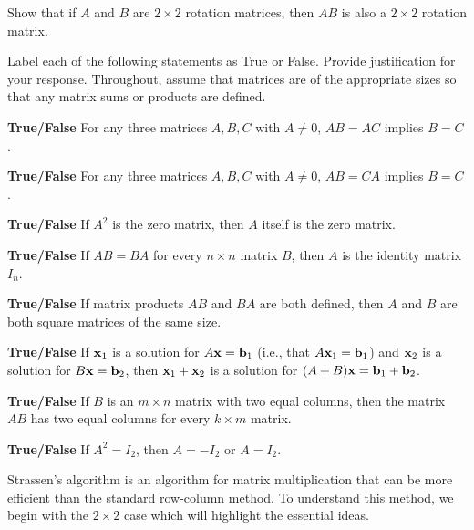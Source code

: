 	\ea

\item Show that if $A$ and $B$ are $2\times 2$ rotation matrices, then $AB$ is also a $2\times 2$ rotation matrix. 
	
\item Label each of the following statements as True or False. Provide justification for your response. Throughout, assume that matrices are of the appropriate sizes so that any matrix sums or products are defined. 
\ba
\item \textbf{True/False} For any three matrices $A, B, C$ with $A \neq 0$, $AB=AC$ implies $B=C$.

\item \textbf{True/False} For any three matrices $A, B, C$ with $A \neq 0$, $AB=CA$ implies $B=C$.

\item \textbf{True/False} If $A^2$ is the zero matrix, then $A$ itself is the zero matrix.

\item \textbf{True/False} If $AB=BA$ for every $n \times n$ matrix $B$, then $A$ is the identity matrix $I_n$.

\item \textbf{True/False} If matrix products $AB$ and $BA$ are both defined, then $A$ and $B$ are both square matrices of the same size.

\item \textbf{True/False} If $\mathbf{x}_1$ is a solution for $A\mathbf{x}=\mathbf{b}_1$ (i.e., that $A\mathbf{x}_1 = \mathbf{b}_1$) and $\mathbf{x}_2$ is a solution for $B\mathbf{x}=\mathbf{b}_2$, then $\mathbf{x}_1+\mathbf{x}_2$ is a solution for $(A+B)\mathbf{x}=\mathbf{b}_1+\mathbf{b}_2$.

\item \textbf{True/False} If $B$ is an $m\times n$ matrix with two equal columns, then the matrix $AB$ has two equal columns for every $k \times m$ matrix.

\item \textbf{True/False} If $A^2 = I_2$, then $A=-I_2$ or $A=I_2$.



\ea
\ee


Strassen's algorithm is an algorithm for matrix multiplication that can be more efficient than the standard row-column method. To understand this method, we begin with the $2 \times 2$ case which will highlight the essential ideas.  

